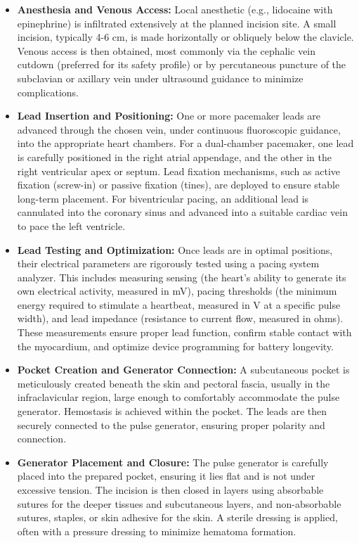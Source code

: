 \begin{itemize}
  \item \textbf{Anesthesia and Venous Access:} Local anesthetic (e.g., lidocaine with epinephrine) is infiltrated extensively at the planned incision site. A small incision, typically 4-6 cm, is made horizontally or obliquely below the clavicle. Venous access is then obtained, most commonly via the cephalic vein cutdown (preferred for its safety profile) or by percutaneous puncture of the subclavian or axillary vein under ultrasound guidance to minimize complications.
  \item \textbf{Lead Insertion and Positioning:} One or more pacemaker leads are advanced through the chosen vein, under continuous fluoroscopic guidance, into the appropriate heart chambers. For a dual-chamber pacemaker, one lead is carefully positioned in the right atrial appendage, and the other in the right ventricular apex or septum. Lead fixation mechanisms, such as active fixation (screw-in) or passive fixation (tines), are deployed to ensure stable long-term placement. For biventricular pacing, an additional lead is cannulated into the coronary sinus and advanced into a suitable cardiac vein to pace the left ventricle.
  \item \textbf{Lead Testing and Optimization:} Once leads are in optimal positions, their electrical parameters are rigorously tested using a pacing system analyzer. This includes measuring sensing (the heart's ability to generate its own electrical activity, measured in mV), pacing thresholds (the minimum energy required to stimulate a heartbeat, measured in V at a specific pulse width), and lead impedance (resistance to current flow, measured in ohms). These measurements ensure proper lead function, confirm stable contact with the myocardium, and optimize device programming for battery longevity.
  \item \textbf{Pocket Creation and Generator Connection:} A subcutaneous pocket is meticulously created beneath the skin and pectoral fascia, usually in the infraclavicular region, large enough to comfortably accommodate the pulse generator. Hemostasis is achieved within the pocket. The leads are then securely connected to the pulse generator, ensuring proper polarity and connection.
  \item \textbf{Generator Placement and Closure:} The pulse generator is carefully placed into the prepared pocket, ensuring it lies flat and is not under excessive tension. The incision is then closed in layers using absorbable sutures for the deeper tissues and subcutaneous layers, and non-absorbable sutures, staples, or skin adhesive for the skin. A sterile dressing is applied, often with a pressure dressing to minimize hematoma formation.
\end{itemize}


